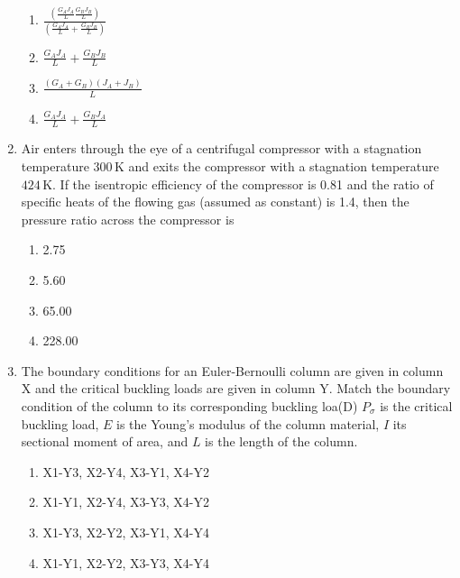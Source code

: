 \documentclass{article}
\begin{document}
\begin{enumerate}
    \begin{enumerate}
        \item $\frac{\left( \frac{G_A J_A}{L} \frac{G_B J_B}{L} \right)}{\left( \frac{G_A J_A}{L} + \frac{G_B J_B}{L} \right)}$
        \item $\frac{G_A J_A}{L} + \frac{G_B J_B}{L}$
        \item $\frac{(G_A + G_B)(J_A + J_B)}{L}$
        \item $\frac{G_A J_A}{L} + \frac{G_B J_A}{L}$
    \end{enumerate}
        

    \item Air enters through the eye of a centrifugal compressor with a stagnation temperature $300 \, \mathrm{K}$ and exits the compressor with a stagnation temperature $424 \, \mathrm{K}$. If the isentropic efficiency of the compressor is 0.81 and the ratio of specific heats of the flowing gas (assumed as constant) is 1.4, then the pressure ratio across the compressor is
    \begin{multicols}{4}
    \begin{enumerate}
        \item 2.75
        \item 5.60
        \item 65.00
        \item 228.00
    \end{enumerate}
    \end{multicols}
        

    \item The boundary conditions for an Euler-Bernoulli column are given in column X and the critical buckling loads are given in column Y. Match the boundary condition of the column to its corresponding buckling loa(D) $P_\sigma$ is the critical buckling load, $E$ is the Young's modulus of the column material, $I$ its sectional moment of area, and $L$ is the length of the column.
    \begin{table}
        
    \end{table}
    \begin{enumerate}
        \item X1-Y3, X2-Y4, X3-Y1, X4-Y2
        \item X1-Y1, X2-Y4, X3-Y3, X4-Y2
        \item X1-Y3, X2-Y2, X3-Y1, X4-Y4
        \item X1-Y1, X2-Y2, X3-Y3, X4-Y4
    \end{enumerate}


\end{enumerate}
\end{document}
